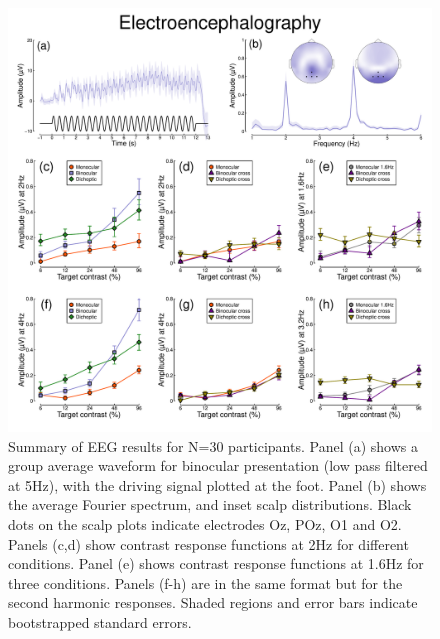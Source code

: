 \documentclass[
]{article}
\begin{document}
\begin{figure}

{\centering \includegraphics{Figures/EEGdata} 

}

\caption{Summary of EEG results for N=30 participants. Panel (a) shows a group average waveform for binocular presentation (low pass filtered at 5Hz), with the driving signal plotted at the foot. Panel (b) shows the average Fourier spectrum, and inset scalp distributions. Black dots on the scalp plots indicate electrodes Oz, POz, O1 and O2. Panels (c,d) show contrast response functions at 2Hz for different conditions. Panel (e) shows contrast response functions at 1.6Hz for three conditions. Panels (f-h) are in the same format but for the second harmonic responses. Shaded regions and error bars indicate bootstrapped standard errors.}\label{fig:EEGdata}
\end{figure}
\end{document}
